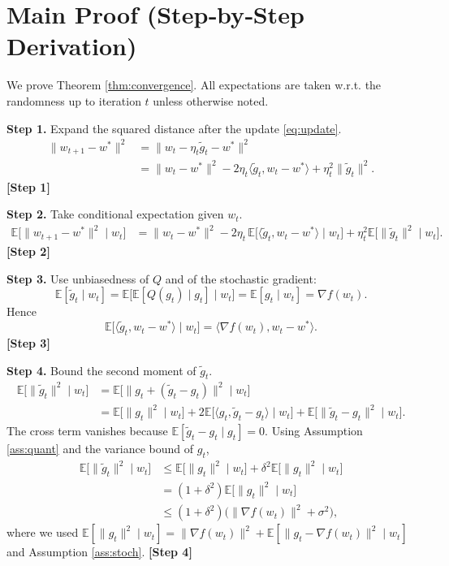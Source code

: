 \documentclass{article}
\newcommand{\E}{\mathbb{E}}
\begin{document}
\section*{Main Proof (Step‑by‑Step Derivation)}
We prove Theorem \ref{thm:convergence}. All expectations are taken w.r.t. the randomness up to iteration $t$ unless otherwise noted.

\noindent\textbf{Step 1.}  Expand the squared distance after the update \eqref{eq:update}.
\begin{align}
\|w_{t+1}-w^{*}\|^{2}
&=\|w_{t}-\eta_{t}\widetilde g_{t}-w^{*}\|^{2}\nonumber\\
&=\|w_{t}-w^{*}\|^{2}
-2\eta_{t}\langle\widetilde g_{t},w_{t}-w^{*}\rangle
+\eta_{t}^{2}\|\widetilde g_{t}\|^{2}.
\label{eq:dist-expansion}
\end{align}
\noindent\textbf{[Step 1]}

\noindent\textbf{Step 2.}  Take conditional expectation given $w_{t}$.
\begin{align}
\E\!\big[\|w_{t+1}-w^{*}\|^{2}\mid w_{t}\big]
&=\|w_{t}-w^{*}\|^{2}
-2\eta_{t}\,\E\!\big[\langle\widetilde g_{t},w_{t}-w^{*}\rangle\mid w_{t}\big]
+\eta_{t}^{2}\E\!\big[\|\widetilde g_{t}\|^{2}\mid w_{t}\big].
\label{eq:exp-dist}
\end{align}
\noindent\textbf{[Step 2]}

\noindent\textbf{Step 3.}  Use unbiasedness of $Q$ and of the stochastic gradient:
\[
\E[\widetilde g_{t}\mid w_{t}]
=\E\big[\E[Q(g_{t})\mid g_{t}]\mid w_{t}\big]
=\E[g_{t}\mid w_{t}]
=\nabla f(w_{t}).
\]
Hence
\[
\E\!\big[\langle\widetilde g_{t},w_{t}-w^{*}\rangle\mid w_{t}\big]
= \langle\nabla f(w_{t}),w_{t}-w^{*}\rangle.
\]
\noindent\textbf{[Step 3]}

\noindent\textbf{Step 4.}  Bound the second moment of $\widetilde g_{t}$.
\begin{align}
\E\!\big[\|\widetilde g_{t}\|^{2}\mid w_{t}\big]
&=\E\!\big[\|g_{t}+(\widetilde g_{t}-g_{t})\|^{2}\mid w_{t}\big]\nonumber\\
&=\E\!\big[\|g_{t}\|^{2}\mid w_{t}\big]
+2\E\!\big[\langle g_{t},\widetilde g_{t}-g_{t}\rangle\mid w_{t}\big]
+\E\!\big[\|\widetilde g_{t}-g_{t}\|^{2}\mid w_{t}\big].
\end{align}
The cross term vanishes because $\E[\widetilde g_{t}-g_{t}\mid g_{t}]=0$.
Using Assumption \ref{ass:quant} and the variance bound of $g_{t}$,
\begin{align}
\E\!\big[\|\widetilde g_{t}\|^{2}\mid w_{t}\big]
&\le \E\!\big[\|g_{t}\|^{2}\mid w_{t}\big]
+\delta^{2}\E\!\big[\|g_{t}\|^{2}\mid w_{t}\big]\nonumber\\
&=(1+\delta^{2})\E\!\big[\|g_{t}\|^{2}\mid w_{t}\big]\nonumber\\
&\le (1+\delta^{2})\big(\|\nabla f(w_{t})\|^{2}+\sigma^{2}\big),
\label{eq:second-moment}
\end{align}
where we used $\E[\|g_{t}\|^{2}\mid w_{t}] = \|\nabla f(w_{t})\|^{2}+\E[\|g_{t}-\nabla f(w_{t})\|^{2}\mid w_{t}]$ and Assumption \ref{ass:stoch}.
\noindent\textbf{[Step 4]}
\end{document}
